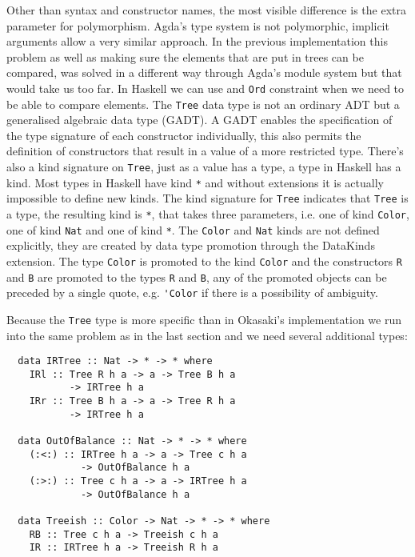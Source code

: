 \documentclass[journal, retainorgcmds]{IEEEtran}
\newcommand{\ihask}[1]{\texttt{#1}}
\begin{document}
Other than syntax and constructor names, the most visible difference is the
extra parameter for polymorphism.
Agda's type system is not polymorphic, implicit arguments allow a very
similar approach.
In the previous implementation this problem as well as making sure the elements
that are put in trees can be compared, was solved in a different way
through Agda's module system but that would take us too far.
In Haskell we can use and \ihask{Ord} constraint when we need to be able to
compare elements.
The \ihask{Tree} data type is not an ordinary ADT but a generalised algebraic
data type (GADT).
A GADT enables the specification of the type signature of each constructor
individually, this also permits the definition of constructors that result in a
value of a more restricted type.
There's also a kind \cite{kind} signature on \ihask{Tree}, just as a value has
a type, a type in Haskell has a kind.
Most types in Haskell have kind \ihask{*} and without extensions it is actually
impossible to define new kinds.
The kind signature for \ihask{Tree} indicates that \ihask{Tree} is a type, the
resulting kind is \ihask{*}, that takes three parameters, i.e. one of kind
\ihask{Color}, one of kind \ihask{Nat} and one of kind \ihask{*}.
The \ihask{Color} and \ihask{Nat} kinds are not defined explicitly, they are
created by data type promotion through the DataKinds extension.
The type \ihask{Color} is promoted to the kind \ihask{Color} and the
constructors \ihask{R} and \ihask{B} are promoted to the types \ihask{R} and
\ihask{B}, any of the promoted objects can be preceded by a single quote, e.g.
\verb|'Color| if there is a possibility of ambiguity.

Because the \ihask{Tree} type is more specific than in Okasaki's implementation
we run into the same problem as in the last section and we need several
additional types:

\begin{verbatim}
  data IRTree :: Nat -> * -> * where
    IRl :: Tree R h a -> a -> Tree B h a
           -> IRTree h a
    IRr :: Tree B h a -> a -> Tree R h a
           -> IRTree h a

  data OutOfBalance :: Nat -> * -> * where
    (:<:) :: IRTree h a -> a -> Tree c h a
             -> OutOfBalance h a
    (:>:) :: Tree c h a -> a -> IRTree h a
             -> OutOfBalance h a

  data Treeish :: Color -> Nat -> * -> * where
    RB :: Tree c h a -> Treeish c h a
    IR :: IRTree h a -> Treeish R h a
\end{verbatim}
\end{document}
